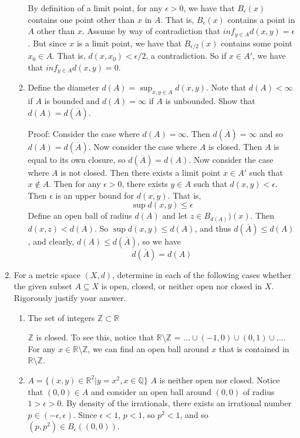 \documentclass{article}
\begin{document}
\begin{enumerate}
\begin{enumerate}
        By definition of a limit point, for any $\epsilon > 0$, we have that $B_{\epsilon}(x)$ contains one point other than $x$ in $A$. That is, $B_{\epsilon}(x)$ contains a point in $A$ other than $x$. Assume by way of contradiction that $inf_{y \in A}d(x,y) = \epsilon$. But since $x$ is a limit point, we have that $B_{\epsilon / 2}(x)$ contains some point $x_0 \in A$. That is, $d(x,x_0) < \epsilon / 2$, a contradiction. So if $x \in A'$, we have that $inf_{y \in A} d(x,y) = 0$.
        
        \item Define the diameter $d(A) = \sup_{x,y \in A} d(x,y)$. Note that $d(A) < \infty$ if $A$ is bounded and $d(A) = \infty$ if $A$ is unbounded. Show that $d(A) = d(\overline{A})$.
        
        Proof: Consider the case where $d(A) = \infty$. Then $d(\overline{A}) = \infty$ and so $d(A) = d(\overline{A})$. Now consider the case where $A$ is closed. Then $A$ is equal to its own closure, so $d(\overline{A}) = d(A)$. Now consider the case where $A$ is not closed. Then there exists a limit point $x \in A'$ such that $x \notin A$. Then for any $\epsilon > 0$, there exists $y \in A$ such that $d(x,y) < \epsilon$. Then $\epsilon$ is an upper bound for $d(x,y)$. That is, 
        \[\sup d(x,y) \leq \epsilon\]
        Define an open ball of radius $d(A)$ and let $z \in B_{d(A)})(x)$. Then $d(x,z) < d(A)$. So $\sup d(x,y) \leq d(A)$, and thus $d(\overline{A}) \leq d(A)$, and clearly, $d(A) \leq d(\overline{A})$, so we have 
        \[d(\overline{A}) = d(A)\]
     \end{enumerate}
    
    \item For a metric space $(X,d)$, determine in each of the following cases whether the given subset $A \subseteq X$ is open, closed, or neither open nor closed in $X$. Rigorously justify your answer. 
    \begin{enumerate}
        \item The set of integers $\mathbb{Z} \subset \mathbb{R}$
        
        $\mathbb{Z}$ is closed. To see this, notice that $\mathbb{R} \setminus \mathbb{Z}$ = $\ldots \cup (-1,0) \cup (0,1) \cup \ldots$. For any $x \in \mathbb{R} \setminus \mathbb{Z}$, we can find an open ball around $x$ that is contained in $\mathbb{R} \setminus \mathbb{Z}$.
        
        \item $A = \{(x,y) \in \mathbb{R}^2 | y = x^2, x\in \mathbb{Q}\}$
        $A$ is neither open nor closed. Notice that $(0,0) \in A$ and consider an open ball around $(0,0)$ of radius $1 > \epsilon > 0$. By density of the irrationals, there exists an irrational number $p \in (-\epsilon, \epsilon)$. Since $\epsilon < 1$, $p < 1$, so $p^2 < 1$, and so $(p, p^2) \in B_{\epsilon}((0,0))$.
        

\end{enumerate}
\end{enumerate}
\end{document}
